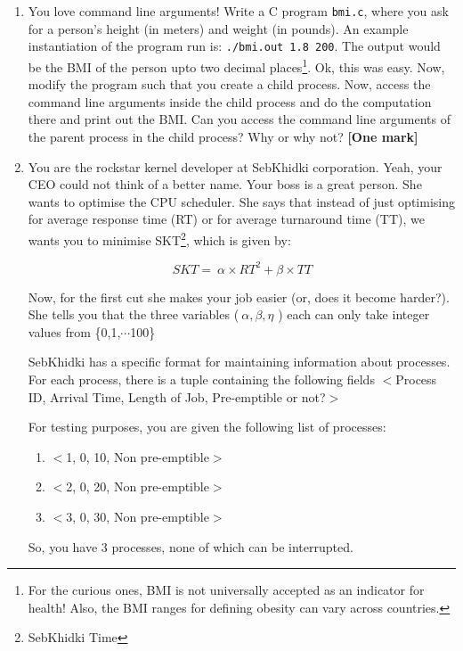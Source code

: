 \documentclass[]{article}
\begin{document}
\begin{enumerate}
\begin{enumerate}
	\end{enumerate}
\item You love command line arguments! Write a C program \texttt{bmi.c}, where you ask for a person's height (in meters) and weight (in pounds). An example instantiation of the program run is: \texttt{./bmi.out 1.8 200}. The output would be the BMI of the person upto two decimal places\footnote{For the curious ones, BMI is not universally accepted as an indicator for health! Also, the BMI ranges for defining obesity can vary across countries.}. Ok, this was easy. Now, modify the program such that you create a child process. Now, access the command line arguments inside the child process and do the computation there and print out the BMI. Can you access the command line arguments of the parent process in the child process? Why or why not? \textbf{[One mark]}

\item You are the rockstar kernel developer at SebKhidki corporation. Yeah, your CEO could not think of a better name. Your boss is a great person. She wants to optimise the CPU scheduler. She says that instead of just optimising for average response time (RT) or for average turnaround time (TT), we wants you to minimise SKT\footnote{SebKhidki Time}, which is given by:

$$SKT =  ~\alpha \times RT^2 + \beta \times TT $$

Now, for the first cut she makes your job easier (or, does it become harder?).
She tells you that the three variables ($~\alpha,  \beta, \eta $ ) each can only take integer values from \{0,1,$\cdots$100\}

SebKhidki has a specific format for maintaining information about processes. For each process, there is a tuple containing the following fields $<$Process ID, Arrival Time, Length of Job, Pre-emptible or not?$>$

For testing purposes, you are given the following list of processes:
\begin{enumerate}
	\item $<$1, 0, 10, Non pre-emptible$>$
	\item $<$2, 0, 20, Non pre-emptible$>$
	\item $<$3, 0, 30, Non pre-emptible$>$
\end{enumerate}

So, you have 3 processes, none of which can be interrupted. 


\end{enumerate}
\end{document}
